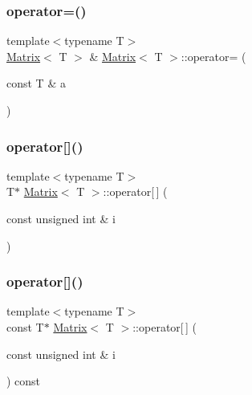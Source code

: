 \mbox{\label{classMatrix_a603960a94121d9b35509199de88d1a92_a603960a94121d9b35509199de88d1a92}} 
\subsubsection{\texorpdfstring{operator=()}{operator=()}\hspace{0.1cm}{\footnotesize\ttfamily [2/2]}}
{\footnotesize\ttfamily template$<$typename T$>$ \\
\mbox{\hyperlink{classMatrix}{Matrix}}$<$ T $>$ \& \mbox{\hyperlink{classMatrix}{Matrix}}$<$ T $>$\+::operator= (\begin{DoxyParamCaption}\item[{const T \&}]{a }\end{DoxyParamCaption})\hspace{0.3cm}{\ttfamily [inline]}}

\mbox{\label{classMatrix_a771eff354da6c0008228dc19cde4142a_a771eff354da6c0008228dc19cde4142a}} 
\subsubsection{\texorpdfstring{operator[]()}{operator[]()}\hspace{0.1cm}{\footnotesize\ttfamily [1/2]}}
{\footnotesize\ttfamily template$<$typename T$>$ \\
T$\ast$ \mbox{\hyperlink{classMatrix}{Matrix}}$<$ T $>$\+::operator\mbox{[}$\,$\mbox{]} (\begin{DoxyParamCaption}\item[{const unsigned int \&}]{i }\end{DoxyParamCaption})\hspace{0.3cm}{\ttfamily [inline]}}

\mbox{\label{classMatrix_af58cf6372d17f7abf5396d32f3ef5cd7_af58cf6372d17f7abf5396d32f3ef5cd7}} 
\subsubsection{\texorpdfstring{operator[]()}{operator[]()}\hspace{0.1cm}{\footnotesize\ttfamily [2/2]}}
{\footnotesize\ttfamily template$<$typename T$>$ \\
const T$\ast$ \mbox{\hyperlink{classMatrix}{Matrix}}$<$ T $>$\+::operator\mbox{[}$\,$\mbox{]} (\begin{DoxyParamCaption}\item[{const unsigned int \&}]{i }\end{DoxyParamCaption}) const\hspace{0.3cm}{\ttfamily [inline]}}


